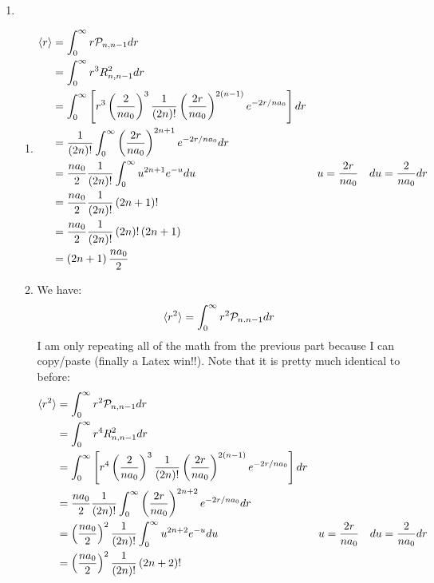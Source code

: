 \documentclass[10pt]{article}
\begin{document}
\begin{enumerate}
  \item 
  \begin{enumerate}
    \item
    \begin{align*}
      \braket{r} &= \int_{0}^{\infty} r \mathcal{P}_{n, n-1} dr \\
      &= \int_{0}^{\infty} r ^3 R^2_{n,n-1} dr \\
      &= \int_{0}^{\infty} \left[ r^3 \left( \frac{2}{n a_0} \right) ^3 \frac{1}{\left( 2n \right)!} \left( \frac{2r}{n a_0} \right) ^{2(n-1)} e ^ {-2r / n a_0} \right] dr \\
      &= \frac{1}{\left( 2n \right)!} \int_{0}^{\infty} \left( \frac{2r}{n a_0} \right) ^{2n+1} e ^ {-2r /n a_0} dr \\
      &= \frac{n a_0}{2} \frac{1}{\left( 2n \right)!} \int_{0}^{\infty} u ^{2n+1} e ^ {-u} du && u = \frac{2r}{n a_0}\quad du=\frac{2}{n a_0}dr \\
      &= \frac{n a_0}{2} \frac{1}{\left( 2n \right)!} \left( 2n+1 \right)!\\
      &= \frac{n a_0}{2} \frac{1}{\left( 2n \right)!} \left( 2n \right)! \left( 2n+1 \right)\\
      &= \left( 2n+1 \right)\frac{n a_0}{2} 
    \end{align*}
    \item 
    We have:
    \begin{equation*}
      \braket{r^2} = \int_{0}^{\infty} r^2 \mathcal{P}_{n.n-1}dr
    \end{equation*}
    I am only repeating all of the math from the previous part because I can copy/paste (finally a Latex win!!).
    Note that it is pretty much identical to before:
    \begin{align*}
      \braket{r^2} &= \int_{0}^{\infty} r^2 \mathcal{P}_{n, n-1} dr \\
      &= \int_{0}^{\infty} r ^4 R^2_{n,n-1} dr \\
      &= \int_{0}^{\infty} \left[ r^4 \left( \frac{2}{n a_0} \right) ^3 \frac{1}{\left( 2n \right)!} \left( \frac{2r}{n a_0} \right) ^{2(n-1)} e ^ {-2r / n a_0} \right] dr \\
      &= \frac{n a_0}{2}\frac{1}{\left( 2n \right)!} \int_{0}^{\infty} \left( \frac{2r}{n a_0} \right) ^{2n+2} e ^ {-2r /n a_0} dr \\
      &= \left(\frac{n a_0}{2}\right)^2 \frac{1}{\left( 2n \right)!} \int_{0}^{\infty} u ^{2n+2} e ^ {-u} du && u = \frac{2r}{n a_0}\quad du=\frac{2}{n a_0}dr \\
      &= \left(\frac{n a_0}{2}\right)^2 \frac{1}{\left( 2n \right)!} \left( 2n+2 \right)!\\

\end{align*}
\end{enumerate}
\end{enumerate}
\end{document}
